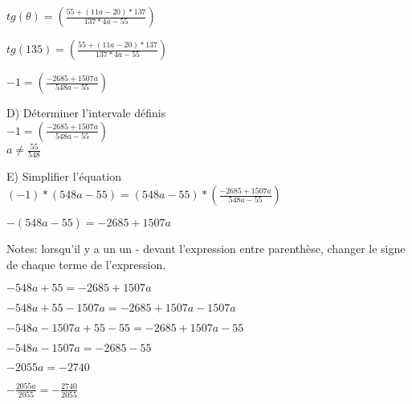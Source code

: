 $tg(\theta) = (\frac{55+(11a-20) *137}{137*4a-55})$
\vspace{5mm} %

$tg(135) = (\frac{55+(11a-20) *137}{137*4a-55})$
\vspace{5mm} %

$-1 = (\frac{-2685+1507a}{548a-55})$
\vspace{10mm} %

D) Déterminer l'intervale définis \\

$-1 = (\frac{-2685+1507a}{548a-55})$ \\
$a\neq \frac{55}{548}$ \\
\vspace{10mm} %

E) Simplifier l'équation \\

$(-1)*(548a-55) = (548a-55)*(\frac{-2685+1507a}{548a-55})$ \\
\vspace{5mm} %

$-(548a-55) = -2685+1507a$ \\
\vspace{5mm} %

Notes: lorsqu'il y a un un - devant l'expression entre parenthèse, changer le signe de chaque terme de l'expression.
\vspace{2mm} %

$-548a+55 = -2685+1507a$ \\
\vspace{5mm} %

$-548a+55-1507a = -2685+1507a-1507a$ \\
\vspace{5mm} %

$-548a-1507a+55-55 = -2685+1507a-55$ \\
\vspace{5mm} %

$-548a-1507a = -2685-55$ \\
\vspace{5mm} %

$-2055a = -2740$ \\
\vspace{5mm} %

$- \frac{2055a}{2055} = - \frac{2740}{2055}$ \\
\vspace{5mm} %

